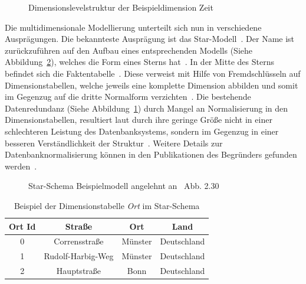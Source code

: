 \documentclass[
  language=german, %
  type=bachelor,%
  ngerman
]{isthesis}
\begin{document}
\begin{content}
  \begin{figure}
    \resizebox{100pt}{!}{}
    \caption{Dimensionslevelstruktur der Beispieldimension Zeit}\label{hierarchie-level-struktur}
  \end{figure}

	Die multidimensionale Modellierung unterteilt sich nun in verschiedene
	Ausprägungen.  Die bekannteste Ausprägung ist das Star-Modell~\cite[][S.
	2]{phipps2002automating}. Der Name ist zurückzuführen auf den Aufbau eines
	entsprechenden Modells (Siehe Abbildung~\ref{fig:star-schema}), welches die
	Form eines Sterns hat~\cite[][S.  44]{Kimball2013}. In der Mitte des Sterns
	befindet sich die Faktentabelle~\cite[][S. 67]{Kemper2010}. Diese verweist
	mit Hilfe von Fremdschlüsseln auf Dimensionstabellen, welche jeweils eine
	komplette Dimension abbilden und somit im Gegenzug auf die dritte Normalform
	verzichten~\cite[][S. 67 f.]{Kemper2010}. Die bestehende Datenredundanz
	(Siehe Abbildung~\ref{table:dimension-table}) durch Mangel an Normalisierung
	in den Dimensionstabellen, resultiert laut \textsc{\citeauthor{Kimball2013}}
	durch ihre geringe Größe nicht in einer schlechteren Leistung des
	Datenbanksystems, sondern im Gegenzug in einer besseren Verständlichkeit der
	Struktur~\cite[][S. 15]{Kimball2013}. Weitere Details zur
	Datenbanknormalisierung können in den Publikationen des
	Begründers
	\textsc{\citeauthor{codd1970relational}} gefunden
	werden~\citeyearpar{codd1970relational,codd1972further}.

  \begin{figure}
    \resizebox{0.5\linewidth}{!}{}
    \caption[Star-Schema Beispielmodell]{Star-Schema Beispielmodell angelehnt an~\cite{Kemper2010} Abb. 2.30}\label{fig:star-schema}
  \end{figure}

  \begin{table}[]
    \footnotesize
    \begin{tabular}{c c c c}
      Ort Id & Straße & Ort & Land \\
      \toprule
      0 & Corrensstraße & Münster & Deutschland \\
      1 & Rudolf-Harbig-Weg & Münster & Deutschland \\
      2 & Hauptstraße & Bonn & Deutschland \\
    \end{tabular}
    \caption{Beispiel der Dimensionstabelle \textit{Ort} im Star-Schema}\label{table:dimension-table}
  \end{table}


\end{content}
\end{document}

